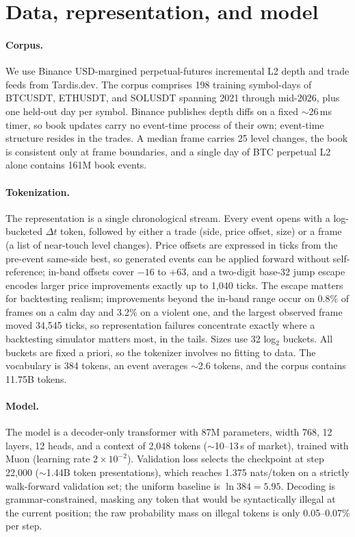 \documentclass[sigconf,anonymous]{acmart}
\begin{document}
\section{Data, representation, and model}
\label{sec:model}

\paragraph{Corpus.} We use Binance USD-margined perpetual-futures incremental L2 depth and trade feeds from Tardis.dev. The corpus comprises 198 training symbol-days of BTCUSDT, ETHUSDT, and SOLUSDT spanning 2021 through mid-2026, plus one held-out day per symbol. Binance publishes depth diffs on a fixed $\sim$26\,ms timer, so book updates carry no event-time process of their own; event-time structure resides in the trades. A median frame carries 25 level changes, the book is consistent only at frame boundaries, and a single day of BTC perpetual L2 alone contains 161M book events.

\paragraph{Tokenization.} The representation is a single chronological stream. Every event opens with a log-bucketed $\Delta t$ token, followed by either a trade (side, price offset, size) or a frame (a list of near-touch level changes). Price offsets are expressed in ticks from the pre-event same-side best, so generated events can be applied forward without self-reference; in-band offsets cover $-16$ to $+63$, and a two-digit base-32 jump escape encodes larger price improvements exactly up to 1,040 ticks. The escape matters for backtesting realism; improvements beyond the in-band range occur on 0.8\% of frames on a calm day and 3.2\% on a violent one, and the largest observed frame moved 34,545 ticks, so representation failures concentrate exactly where a backtesting simulator matters most, in the tails. Sizes use 32 log$_2$ buckets. All buckets are fixed a priori, so the tokenizer involves no fitting to data. The vocabulary is 384 tokens, an event averages $\sim$2.6 tokens, and the corpus contains 11.75B tokens.

\paragraph{Model.} The model is a decoder-only transformer with 87M parameters, width 768, 12 layers, 12 heads, and a context of 2,048 tokens ($\sim$10--13\,s of market), trained with Muon (learning rate $2\times10^{-2}$). Validation loss selects the checkpoint at step 22{,}000 ($\sim$1.44B token presentations), which reaches 1.375 nats/token on a strictly walk-forward validation set; the uniform baseline is $\ln 384 = 5.95$. Decoding is grammar-constrained, masking any token that would be syntactically illegal at the current position; the raw probability mass on illegal tokens is only 0.05--0.07\% per step.
\end{document}
